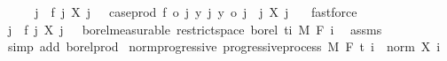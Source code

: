 \begin{isabellebody}
\ \ \isamarkupfalse%
\ \isamarkupfalse%
\ {\isachardoublequoteopen}{\isacharparenleft}{\kern0pt}{\isasymlambda}{\isacharparenleft}{\kern0pt}j{\isacharcomma}{\kern0pt}\ {\isasymxi}{\isacharparenright}{\kern0pt}{\isachardot}{\kern0pt}\ f\ j\ {\isacharparenleft}{\kern0pt}X\ j\ {\isasymxi}{\isacharparenright}{\kern0pt}{\isacharparenright}{\kern0pt}\ {\isacharequal}{\kern0pt}\ case{\isacharunderscore}{\kern0pt}prod\ f\ o\ {\isacharparenleft}{\kern0pt}{\isacharparenleft}{\kern0pt}{\isasymlambda}{\isacharparenleft}{\kern0pt}j{\isacharcomma}{\kern0pt}\ y{\isacharparenright}{\kern0pt}{\isachardot}{\kern0pt}\ {\isacharparenleft}{\kern0pt}j{\isacharcomma}{\kern0pt}\ y{\isacharparenright}{\kern0pt}{\isacharparenright}{\kern0pt}\ o\ {\isacharparenleft}{\kern0pt}{\isasymlambda}{\isacharparenleft}{\kern0pt}j{\isacharcomma}{\kern0pt}\ {\isasymxi}{\isacharparenright}{\kern0pt}{\isachardot}{\kern0pt}\ {\isacharparenleft}{\kern0pt}j{\isacharcomma}{\kern0pt}\ X\ j\ {\isasymxi}{\isacharparenright}{\kern0pt}{\isacharparenright}{\kern0pt}{\isacharparenright}{\kern0pt}{\isachardoublequoteclose}\ \isamarkupfalse%
\ fastforce\isanewline
\ \ \isamarkupfalse%
\ \isamarkupfalse%
\ {\isachardoublequoteopen}{\isacharparenleft}{\kern0pt}{\isasymlambda}{\isacharparenleft}{\kern0pt}j{\isacharcomma}{\kern0pt}\ {\isasymxi}{\isacharparenright}{\kern0pt}{\isachardot}{\kern0pt}\ {\isacharparenleft}{\kern0pt}f\ j{\isacharparenright}{\kern0pt}\ {\isacharparenleft}{\kern0pt}X\ j\ {\isasymxi}{\isacharparenright}{\kern0pt}{\isacharparenright}{\kern0pt}\ {\isasymin}\ borel{\isacharunderscore}{\kern0pt}measurable\ {\isacharparenleft}{\kern0pt}restrict{\isacharunderscore}{\kern0pt}space\ borel\ {\isacharbraceleft}{\kern0pt}ti{\isacharbraceright}{\kern0pt}\ {\isasymOtimes}\isactrlsub M\ F\ i{\isacharparenright}{\kern0pt}{\isachardoublequoteclose}\ \isamarkupfalse%
\ assms\ \isamarkupfalse%
\ {\isacharparenleft}{\kern0pt}simp\ add{\isacharcolon}{\kern0pt}\ borel{\isacharunderscore}{\kern0pt}prod{\isacharparenright}{\kern0pt}\isanewline
{}\isamarkupfalse%
%
\endisatagproof
{\isafoldproof}%
%
\isadelimproof
\isanewline
%
\endisadelimproof
\isanewline
{}\isamarkupfalse%
\ norm{\isacharunderscore}{\kern0pt}progressive{\isacharcolon}{\kern0pt}\ {\isachardoublequoteopen}progressive{\isacharunderscore}{\kern0pt}process\ M\ F\ t\ {\isacharparenleft}{\kern0pt}{\isasymlambda}i\ {\isasymxi}{\isachardot}{\kern0pt}\ norm\ {\isacharparenleft}{\kern0pt}X\ i\ {\isasymxi}{\isacharparenright}{\kern0pt}{\isacharparenright}{\kern0pt}{\isachardoublequoteclose}%

\end{isabellebody}
